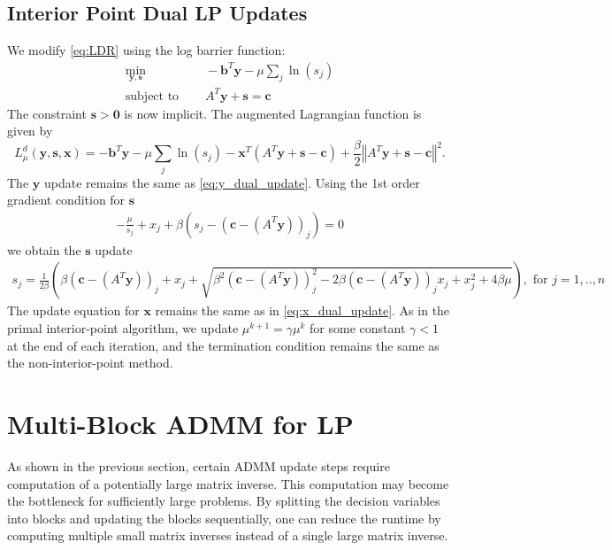 \documentclass{article}
\begin{document}
\subsection*{Interior Point Dual LP Updates}
We modify \eqref{eq:LDR} using the log barrier function:
\begin{align}
\min_{\mathbf{y}, \mathbf{s}} &\quad -\mathbf{b}^T\mathbf{y} - \mu \sum_j \ln (s_j)  \tag{LDRB}\label{LDRB} \\
\text{subject to } &\quad  A^T \mathbf{y}  + \mathbf{s} = \mathbf{c}  \nonumber
\end{align}
The constraint $\mathbf{s} > \mathbf{0}$ is now implicit. The augmented Lagrangian function is given by
\[
L_{\mu}^{d}(\mathbf{y},\mathbf{s},\mathbf{x})=-\mathbf{b}^{T}\mathbf{y}-\mu\sum_{j}\ln\left(s_{j}\right)-\mathbf{x}^{T}\left(A^{T}\mathbf{y}+\mathbf{s}-\mathbf{c}\right)+\frac{\beta}{2}\left\Vert A^{T}\mathbf{y}+\mathbf{s}-\mathbf{c}\right\Vert ^{2}.
\]
The $\mathbf{y}$ update remains the same as \eqref{eq:y_dual_update}. Using the 1st order gradient condition for $\mathbf{s}$
\begin{align}
- \frac{\mu}{s_j} + x_j  + \beta \left(s_j - (\mathbf{c} - (A^T \mathbf{y}))_j\right)= 0
\end{align}
we obtain the $\mathbf{s}$ update
\begin{align}
s_j = \frac{1}{2\beta}\left(\beta (\mathbf{c} - (A^T \mathbf{y}))_j + x_j  + \sqrt{\beta^2 (\mathbf{c} - (A^T \mathbf{y}))_j^2 - 2\beta (\mathbf{c} - (A^T \mathbf{y}))_j x_{j} + x_j^2 + 4\beta\mu } \right), \text{ for $j = 1,..,n$}
\end{align}
The update equation for $\mathbf{x}$ remains the same as in \eqref{eq:x_dual_update}. As in the primal interior-point algorithm, we update $\mu^{k+1} = \gamma \mu^k$ for some constant $\gamma<1$ at the end of each iteration, and the termination condition remains the same as the non-interior-point method.

\section{Multi-Block ADMM for LP}

As shown in the previous section, certain ADMM update steps require computation of a potentially large matrix inverse. This computation may become the bottleneck for sufficiently large problems. By splitting the decision variables into blocks and updating the blocks sequentially, one can reduce the runtime by computing multiple small matrix inverses instead of a single large matrix inverse.
\end{document}
